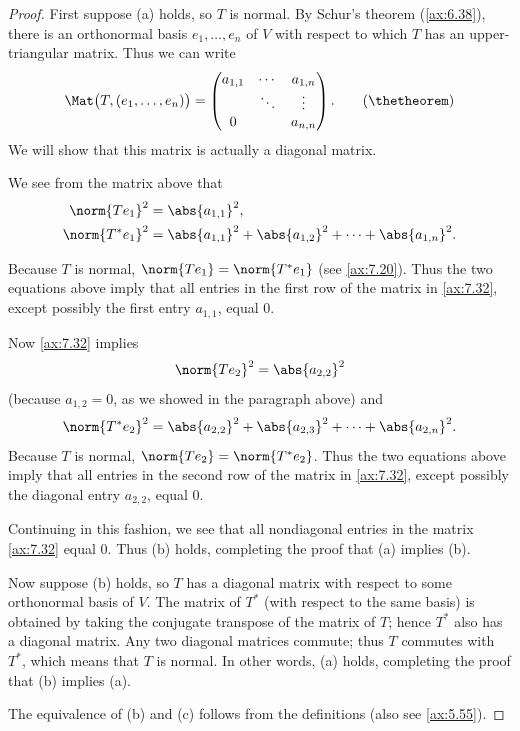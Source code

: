\begin{proof}
First suppose (a) holds, so $T$ is normal. By Schur's theorem (\ref{ax:6.38}),
there is an orthonormal basis $e_1,\dots,e_n$ of $V$ with respect to which $T$
has an upper-triangular matrix. Thus we can write
\[ \Mat\bigl(T,(e_1,\dots,e_n)\bigr) =
   \begin{pmatrix} a_{1,1} & \cdots & a_{1,n}\\ & \ddots & \vdots\\
   0 & & a_{n,n} \end{pmatrix}. \tag{\thetheorem} \]
We will show that this matrix is actually a diagonal matrix.

We see from the matrix above that
\begin{align*}
\norm{Te_1}^2 &= \abs{a_{1,1}}^2,\\
\norm{T^*e_1}^2 &= \abs{a_{1,1}}^2+\abs{a_{1,2}}^2+\cdots+\abs{a_{1,n}}^2.
\end{align*}

Because $T$ is normal, $\norm{Te_1}=\norm{T^*e_1}$ (see \ref{ax:7.20}). Thus the
two equations above imply that all entries in the first row of the matrix in
\ref{ax:7.32}, except possibly the first entry $a_{1,1}$, equal $0$.

Now \ref{ax:7.32} implies
\[ \norm{Te_2}^2 = \abs{a_{2,2}}^2 \]
(because $a_{1,2}=0$, as we showed in the paragraph above) and
\[ \norm{T^*e_2}^2 = \abs{a_{2,2}}^2+\abs{a_{2,3}}^2+\cdots+\abs{a_{2,n}}^2. \]
Because $T$ is normal, $\norm{Te_2}=\norm{T^*e_2}$. Thus the two equations
above imply that all entries in the second row of the matrix in \ref{ax:7.32},
except possibly the diagonal entry $a_{2,2}$, equal $0$.

Continuing in this fashion, we see that all nondiagonal entries in the matrix
\ref{ax:7.32} equal $0$. Thus (b) holds, completing the proof that (a) implies
(b).

Now suppose (b) holds, so $T$ has a diagonal matrix with respect to some
orthonormal basis of $V$. The matrix of $T^*$ (with respect to the same basis)
is obtained by taking the conjugate transpose of the matrix of $T$; hence $T^*$
also has a diagonal matrix. Any two diagonal matrices commute; thus $T$
commutes with $T^*$, which means that $T$ is normal. In other words, (a) holds,
completing the proof that (b) implies (a).

The equivalence of (b) and (c) follows from the definitions (also see
\ref{ax:5.55}).
\end{proof}

